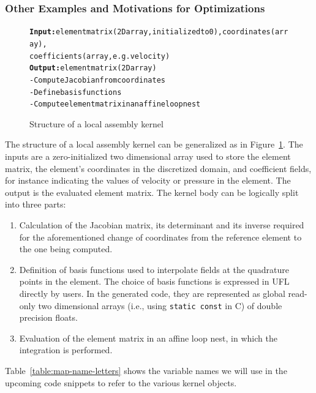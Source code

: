 \subsubsection{Other Examples and Motivations for Optimizations}

\begin{figure}
\begin{alltt}
\scriptsize
\textbf{Input:} element matrix (2D array, initialized to 0), coordinates (array), 
       coefficients (array, e.g. velocity)
\textbf{Output:} element matrix (2D array)
- Compute Jacobian from coordinates
- Define basis functions
- Compute element matrix in an affine loop nest
\end{alltt}
\caption{Structure of a local assembly kernel}
\label{code:general-structure}
\end{figure}


The structure of a local assembly kernel can be generalized as in Figure~\ref{code:general-structure}. The inputs are a zero-initialized two dimensional array used to store the element matrix, the element's coordinates in the discretized domain, and coefficient fields, for instance indicating the values of velocity or pressure in the element. The output is the evaluated element matrix. The kernel body can be logically split into three parts:
\begin{enumerate}
  \item Calculation of the Jacobian matrix, its determinant and its
    inverse required for the aforementioned change of coordinates from
    the reference element to the one being computed.
  \item Definition of basis functions used to interpolate fields at the
    quadrature points in the element. The choice of basis functions is
    expressed in UFL directly by users. In the generated code, they are
    represented as global read-only two dimensional arrays (i.e., using
    \texttt{static const} in C) of double precision floats.
  \item Evaluation of the element matrix in an affine loop nest, in which
    the integration is performed.
\end{enumerate}
Table~\ref{table:map-name-letters} shows the variable names we will use in the upcoming code snippets to refer to the various kernel objects.

